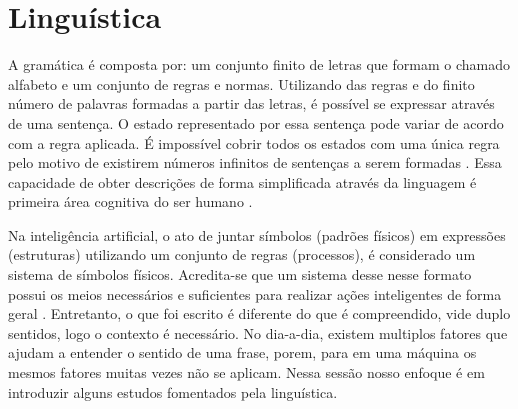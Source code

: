 \section{Linguística}
A gramática é composta por: um conjunto finito de letras que formam o chamado alfabeto e um conjunto de regras e normas. Utilizando das regras e do finito número de palavras formadas a partir das letras, é possível se expressar através de uma sentença. O estado representado por essa sentença pode variar de acordo com a regra aplicada. É impossível cobrir todos os estados com uma única regra pelo motivo de existirem números infinitos de sentenças a serem formadas \cite[13-25]{chomsky2002syntactic}. Essa capacidade de obter descrições de forma simplificada através da linguagem é primeira área cognitiva do ser humano \cite[131]{putnam1975mind}.

Na inteligência artificial, o ato de juntar símbolos (padrões físicos) em expressões (estruturas) utilizando um conjunto de regras (processos), é considerado um sistema de símbolos físicos. Acredita-se que um sistema desse nesse formato possui os meios necessários e suficientes para realizar ações inteligentes de forma geral \cite[116]{newell1976ComputerSA}. Entretanto, o que foi escrito é diferente do que é compreendido, vide duplo sentidos, logo o contexto é necessário. No dia-a-dia, existem multiplos fatores que ajudam a entender o sentido de uma frase, porem, para em uma máquina os mesmos fatores muitas vezes não se aplicam. Nessa sessão nosso enfoque é em introduzir alguns estudos fomentados pela linguística.



